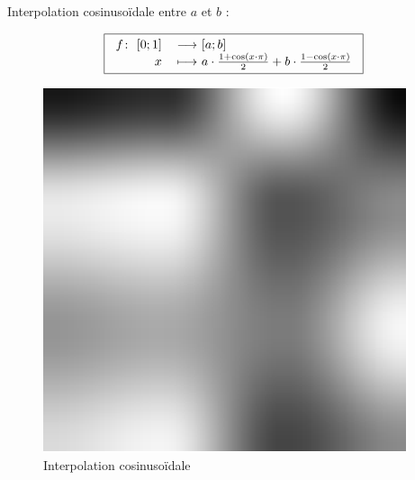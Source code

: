 \documentclass[12pt, a4paper]{article}
\newcommand{\fonction}[5]{
\begin{tabular}{rl}
    #1$\colon$ #2 & $\longrightarrow$ #3 \\
             #4 & $\longmapsto$ #5
\end{tabular}
}
\begin{document}
Interpolation cosinusoïdale entre $a$ et $b$ :

\[\boxed{
\fonction{$f$}{$[0;1]$}{$[a;b]$}{$x$}{$a \cdot \frac {1+\cos(x\cdot\pi)} {2} + b \cdot \frac {1-\cos(x\cdot\pi)} {2}$}
}\]

\begin{figure}[!h]
	\centering
	   \caption{Interpolation cosinusoïdale}
	   \bigskip
	   \includegraphics[scale=1]{interpol_cos}
\end{figure}


\clearpage
\end{document}

